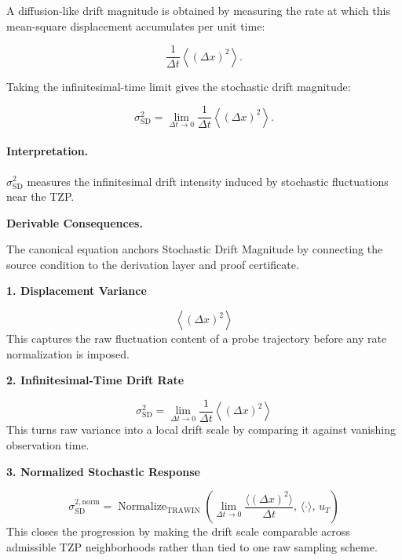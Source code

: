 A diffusion-like drift magnitude is obtained by measuring the rate at which this mean-square displacement accumulates per unit time:

\begin{equation}
\frac{1}{\Delta t}
\left\langle(\Delta x)^2\right\rangle .
\end{equation}

Taking the infinitesimal-time limit gives the stochastic drift magnitude:

\begin{equation}
\boxed{
\sigma_{\mathrm{SD}}^{2}
=
\lim_{\Delta t\to 0}
\frac{1}{\Delta t}
\left\langle
(\Delta x)^2
\right\rangle .
}
\end{equation}

\paragraph{Interpretation.}
$\sigma_{\mathrm{SD}}^{2}$ measures the infinitesimal drift intensity induced by stochastic fluctuations near the TZP.

\par\vspace{0.35em}
\noindent\textbf{Derivable Consequences.}\quad
\begingroup
\footnotesize
\raggedright
The canonical equation anchors Stochastic Drift Magnitude by connecting the source condition to the derivation layer and proof certificate.
\par\endgroup

\noindent\textbf{1. Displacement Variance}\par
\[
\left\langle (\Delta x)^{2} \right\rangle
\]
\noindent This captures the raw fluctuation content of a probe trajectory before any rate normalization is imposed.\par
\noindent\textbf{2. Infinitesimal-Time Drift Rate}\par
\[
\sigma_{\mathrm{SD}}^{2}
=
\lim_{\Delta t \to 0}
\frac{1}{\Delta t}
\left\langle (\Delta x)^{2} \right\rangle
\]
\noindent This turns raw variance into a local drift scale by comparing it against vanishing observation time.\par
\noindent\textbf{3. Normalized Stochastic Response}\par
\[
\sigma_{\mathrm{SD}}^{2,\mathrm{norm}}
=
\operatorname{Normalize}_{\mathrm{TRAWIN}}
\!\left(
\lim_{\Delta t \to 0}
\frac{\langle (\Delta x)^2 \rangle}{\Delta t},\,
\langle \cdot \rangle,\,
u_{T}
\right)
\]
\noindent This closes the progression by making the drift scale comparable across admissible TZP neighborhoods rather than tied to one raw sampling scheme.\par


